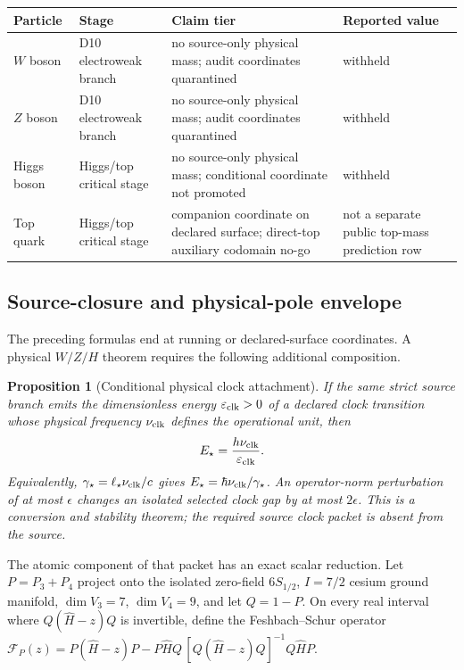 \documentclass[11pt]{article}
\newtheorem{proposition}[theorem]{Proposition}
\begin{document}
\begin{table}[h]
\centering
\scriptsize
\begin{tabular}{@{}>{\raggedright\arraybackslash}p{}>{\raggedright\arraybackslash}p{}>{\raggedright\arraybackslash}p{}>{\raggedright\arraybackslash}p{}@{}}
\toprule
Particle & Stage & Claim tier & Reported value \\
\midrule
\(W\) boson & D10 electroweak branch & no source-only physical mass; audit coordinates quarantined & withheld \\
\(Z\) boson & D10 electroweak branch & no source-only physical mass; audit coordinates quarantined & withheld \\
Higgs boson & Higgs/top critical stage & no source-only physical mass; conditional coordinate not promoted & withheld \\
Top quark & Higgs/top critical stage & companion coordinate on declared surface; direct-top auxiliary codomain no-go & not a separate public top-mass prediction row \\
\bottomrule
\end{tabular}
\end{table}

\subsection{Source-closure and physical-pole envelope}\label{wzh-source-closure-envelope}

The preceding formulas end at running or declared-surface coordinates.  A
physical \(W/Z/H\) theorem requires the following additional composition.

\begin{proposition}[Conditional physical clock attachment]
If the same strict source branch emits the dimensionless energy
\(\varepsilon_{\rm clk}>0\) of a declared clock transition whose physical
frequency \(\nu_{\rm clk}\) defines the operational unit, then
\[
E_\star=\frac{h\nu_{\rm clk}}{\varepsilon_{\rm clk}}.
\]
Equivalently, \(\gamma_\star=\ell_\star\nu_{\rm clk}/c\) gives
\(E_\star=\hbar\nu_{\rm clk}/\gamma_\star\).  An operator-norm perturbation
of at most \(\epsilon\) changes an isolated selected clock gap by at most
\(2\epsilon\).  This is a conversion and stability theorem; the required
source clock packet is absent from the source.
\end{proposition}

The atomic component of that packet has an exact scalar reduction.  Let
\(P=P_3+P_4\) project onto the isolated zero-field \(6S_{1/2}\), \(I=7/2\)
cesium ground manifold, \(\dim V_3=7\), \(\dim V_4=9\), and let \(Q=1-P\).
On every real interval where \(Q(\widehat H-z)Q\) is invertible, define the
Feshbach--Schur operator
\(\mathcal F_P(z)=P(\widehat H-z)P-P\widehat HQ\,[Q(\widehat H-z)Q]^{-1}Q\widehat HP\).
\end{document}
